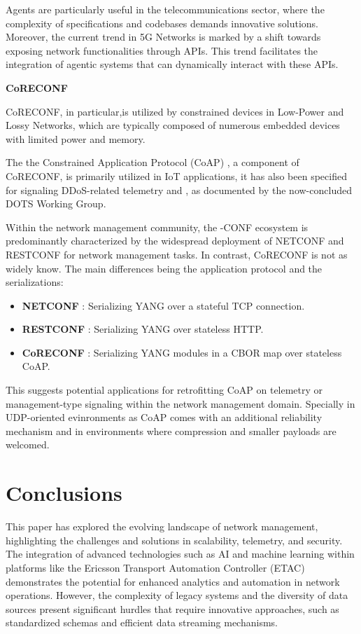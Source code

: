 \documentclass[10pt,sigconf]{iabart}
\begin{document}
Agents are particularly useful in the telecommunications sector, where the complexity of specifications and codebases demands innovative solutions. Moreover, the current trend in 5G Networks is marked by a shift towards exposing network functionalities through APIs. This trend facilitates the integration of agentic systems that can dynamically interact with these APIs.

\textbf{CoRECONF}

CoRECONF, in particular,is utilized by constrained devices in Low-Power and Lossy Networks, which are typically composed of numerous embedded devices with limited power and memory. 

The the Constrained Application Protocol (CoAP) \cite{RFC7252}, a component of CoRECONF, is primarily utilized in IoT applications, it has also been specified for signaling DDoS-related telemetry \cite{RFC9132} and \cite{RFC9362}, as documented by the now-concluded DOTS Working Group. 

Within the network management community, the -CONF ecosystem is predominantly characterized by the widespread deployment of NETCONF and RESTCONF for network management tasks. In contrast, CoRECONF is not as widely know. The main differences being the application protocol and the serializations:

\begin{itemize}
  \item \textbf{NETCONF} \cite{RFC6241}: Serializing YANG over a stateful TCP connection.    
  \item \textbf{RESTCONF} \cite{RFC8040}: Serializing YANG over stateless HTTP.
  \item \textbf{CoRECONF} \cite{draft-ietf-core-comi}: Serializing YANG modules in a CBOR \cite{RFC9254} map over stateless CoAP.
\end{itemize}

This suggests potential applications for retrofitting CoAP on telemetry or management-type signaling within the network management domain. Specially in UDP-oriented evinronments as CoAP comes with an additional reliability mechanism and in environments where compression and smaller payloads are welcomed. 

\section{Conclusions} \label{conclusions}


This paper has explored the evolving landscape of network management, highlighting the challenges and solutions in scalability, telemetry, and security. The integration of advanced technologies such as AI and machine learning within platforms like the Ericsson Transport Automation Controller (ETAC) demonstrates the potential for enhanced analytics and automation in network operations. However, the complexity of legacy systems and the diversity of data sources present significant hurdles that require innovative approaches, such as standardized schemas and efficient data streaming mechanisms.
\end{document}
